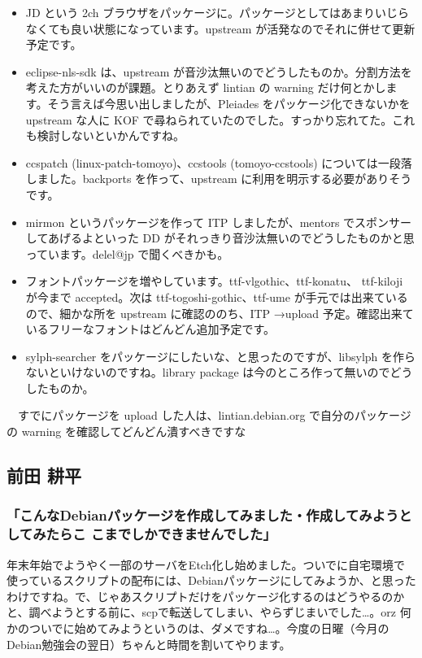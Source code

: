 \documentclass[mingoth,a4paper]{jsarticle}
\begin{document}
\begin{itemize}
 
 \item  JD という 2ch ブラウザをパッケージに。パッケージとしてはあまりいじらなくても良い状態になっています。upstream が活発なのでそれに併せて更新予定です。
 \item  eclipse-nls-sdk は、upstream が音沙汰無いのでどうしたものか。分割方法を考えた方がいいのが課題。とりあえず lintian の warning だけ何とかします。そう言えば今思い出しましたが、Pleiades をパッケージ化できないかを upstream な人に KOF で尋ねられていたのでした。すっかり忘れてた。これも検討しないといかんですね。
 \item  ccspatch (linux-patch-tomoyo)、ccstools (tomoyo-ccstools) については一段落しました。backports を作って、upstream に利用を明示する必要がありそうです。
 \item  mirmon というパッケージを作って ITP しましたが、mentors でスポンサーしてあげるよといった DD がそれっきり音沙汰無いのでどうしたものかと思っています。delel@jp で聞くべきかも。
 \item  フォントパッケージを増やしています。ttf-vlgothic、ttf-konatu、
	ttf-kiloji が今まで accepted。次は ttf-togoshi-gothic、ttf-ume
	が手元では出来ているので、細かな所を upstream に確認ののち、ITP
	→upload 予定。確認出来ているフリーなフォントはどんどん追加予定です。
 \item  sylph-searcher をパッケージにしたいな、と思ったのですが、libsylph を作らないといけないのですね。library package は今のところ作って無いのでどうしたものか。
\end{itemize}

　すでにパッケージを upload した人は、lintian.debian.org で自分のパッケージの warning を確認してどんどん潰すべきですな


\subsection{前田 耕平}


\subsubsection{「こんなDebianパッケージを作成してみました・作成してみようとしてみたらこ
こまでしかできませんでした」}

年末年始でようやく一部のサーバをEtch化し始めました。ついでに自宅環境で使っているスクリプトの配布には、Debianパッケージにしてみようか、と思ったわけですね。で、じゃあスクリプトだけをパッケージ化するのはどうやるのかと、調べようとする前に、scpで転送してしまい、やらずじまいでした…。orz
何かのついでに始めてみようというのは、ダメですね…。今度の日曜（今月のDebian勉強会の翌日）ちゃんと時間を割いてやります。
\end{document}
